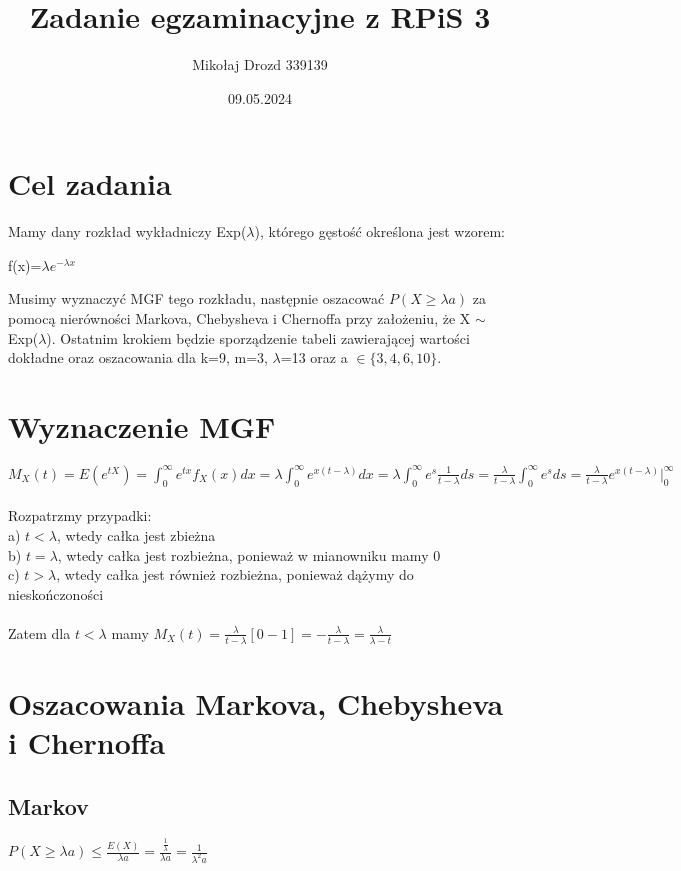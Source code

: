 \documentclass{article}
\title{Zadanie egzaminacyjne z RPiS 3}
\author{Mikołaj Drozd 339139}
\date{09.05.2024}
\begin{document}
\maketitle
\section{Cel zadania}
\large
Mamy dany rozkład wykładniczy Exp($\lambda$), którego gęstość określona jest wzorem:\\
\begin{center}
   f(x)=$\lambda e^{-\lambda x}$ 
\end{center}
Musimy wyznaczyć MGF tego rozkładu, następnie oszacować $P(X \geqslant\lambda a)$ za pomocą nierówności Markova, Chebysheva i Chernoffa przy założeniu, że X $\sim$ Exp($\lambda$). Ostatnim krokiem będzie sporządzenie tabeli zawierającej wartości dokładne oraz oszacowania dla k=9, m=3, $\lambda$=13 oraz a $\in \{3,4,6,10\}$.

\section{Wyznaczenie MGF}
\Large
$M_X(t) = E(e^{t X}) = \int_0^\infty e^{t x}  {f_X}(x)dx =\lambda \int_0^\infty e^{x(t-\lambda)}dx = \lambda \int_0^\infty e^s \frac 1 {t-\lambda}ds = \frac \lambda {t-\lambda} \int_0^\infty e^s ds = \frac \lambda {t-\lambda} e^{x (t-\lambda)}|_0^\infty$ \\ \\
Rozpatrzmy przypadki: \\
a) $t<\lambda$, wtedy całka jest zbieżna \\
b) $t=\lambda$, wtedy całka jest rozbieżna, ponieważ w mianowniku mamy 0 \\
c) $t>\lambda$, wtedy całka jest również rozbieżna, ponieważ dążymy do nieskończoności \\ \\
Zatem dla $t<\lambda$ mamy $M_X(t) = \frac \lambda {t-\lambda} [0 - 1] = - \frac \lambda {t-\lambda} = \frac \lambda {\lambda - t}$

\section{Oszacowania Markova, Chebysheva i Chernoffa}
\Large
\subsection{Markov}
$P(X \geqslant\lambda a ) \leqslant \frac {E(X)} {\lambda a} = \frac {\frac 1 \lambda} {\lambda a} = \frac 1 {\lambda^2 a}$ 
\end{document}

